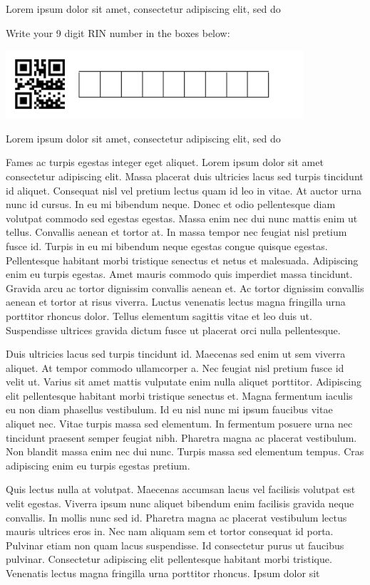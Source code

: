 \documentclass[12pt]{article}
\begin{document}
\vspace{0.1in}
\noindent
\begin{minipage}{1.1in}
Lorem ipsum dolor sit amet, consectetur adipiscing elit, sed do
\end{minipage}
\hfill
\begin{minipage}{4in}
Write your 9 digit RIN number in the boxes below:

\noindent
\includegraphics[height=1in]{blank_QR_numeric_id.png}
\end{minipage}
\hfill
\begin{minipage}{1.1in}
Lorem ipsum dolor sit amet, consectetur adipiscing elit, sed do
\end{minipage}

Fames ac turpis egestas integer eget aliquet. Lorem ipsum dolor sit amet consectetur adipiscing elit. Massa placerat duis ultricies lacus sed turpis tincidunt id aliquet. Consequat nisl vel pretium lectus quam id leo in vitae. At auctor urna nunc id cursus. In eu mi bibendum neque. Donec et odio pellentesque diam volutpat commodo sed egestas egestas. Massa enim nec dui nunc mattis enim ut tellus. Convallis aenean et tortor at. In massa tempor nec feugiat nisl pretium fusce id. Turpis in eu mi bibendum neque egestas congue quisque egestas. Pellentesque habitant morbi tristique senectus et netus et malesuada. Adipiscing enim eu turpis egestas. Amet mauris commodo quis imperdiet massa tincidunt. Gravida arcu ac tortor dignissim convallis aenean et. Ac tortor dignissim convallis aenean et tortor at risus viverra. Luctus venenatis lectus magna fringilla urna porttitor rhoncus dolor. Tellus elementum sagittis vitae et leo duis ut. Suspendisse ultrices gravida dictum fusce ut placerat orci nulla pellentesque.

Duis ultricies lacus sed turpis tincidunt id. Maecenas sed enim ut sem viverra aliquet. At tempor commodo ullamcorper a. Nec feugiat nisl pretium fusce id velit ut. Varius sit amet mattis vulputate enim nulla aliquet porttitor. Adipiscing elit pellentesque habitant morbi tristique senectus et. Magna fermentum iaculis eu non diam phasellus vestibulum. Id eu nisl nunc mi ipsum faucibus vitae aliquet nec. Vitae turpis massa sed elementum. In fermentum posuere urna nec tincidunt praesent semper feugiat nibh. Pharetra magna ac placerat vestibulum. Non blandit massa enim nec dui nunc. Turpis massa sed elementum tempus. Cras adipiscing enim eu turpis egestas pretium.

Quis lectus nulla at volutpat. Maecenas accumsan lacus vel facilisis volutpat est velit egestas. Viverra ipsum nunc aliquet bibendum enim facilisis gravida neque convallis. In mollis nunc sed id. Pharetra magna ac placerat vestibulum lectus mauris ultrices eros in. Nec nam aliquam sem et tortor consequat id porta. Pulvinar etiam non quam lacus suspendisse. Id consectetur purus ut faucibus pulvinar. Consectetur adipiscing elit pellentesque habitant morbi tristique. Venenatis lectus magna fringilla urna porttitor rhoncus. Ipsum dolor sit
\end{document}
